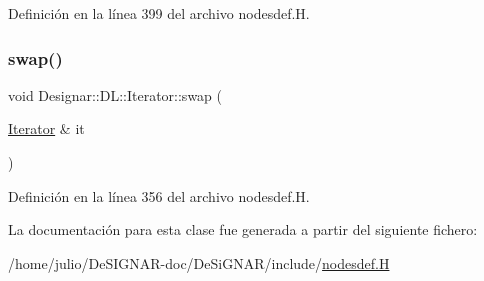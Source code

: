 Definición en la línea 399 del archivo nodesdef.\+H.

\mbox{\label{class_designar_1_1_d_l_1_1_iterator_af8bba1d661f8d6300664481d7c6fd976}} 
\subsubsection{\texorpdfstring{swap()}{swap()}}
{\footnotesize\ttfamily void Designar\+::\+D\+L\+::\+Iterator\+::swap (\begin{DoxyParamCaption}\item[{\hyperlink{class_designar_1_1_d_l_1_1_iterator}{Iterator} \&}]{it }\end{DoxyParamCaption})\hspace{0.3cm}{\ttfamily [inline]}}



Definición en la línea 356 del archivo nodesdef.\+H.



La documentación para esta clase fue generada a partir del siguiente fichero\+:\begin{DoxyCompactItemize}
\item 
/home/julio/\+De\+S\+I\+G\+N\+A\+R-\/doc/\+De\+Si\+G\+N\+A\+R/include/\hyperlink{nodesdef_8_h}{nodesdef.\+H}\end{DoxyCompactItemize}
